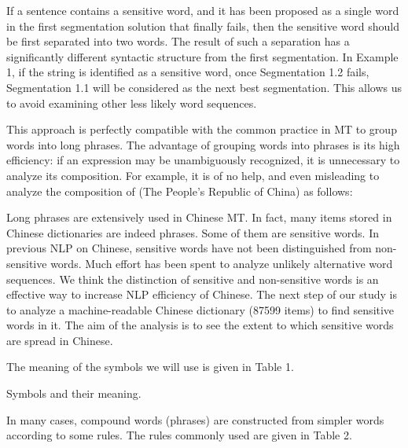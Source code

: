 If a sentence contains a sensitive word, and it has been proposed as a single word in the first segmentation solution that 
finally fails, then the sensitive word should be first separated into two words. The result of such a separation has a 
significantly different syntactic structure from the first segmentation. In Example 1, if the string   is identified as a 
sensitive word, once Segmentation 1.2 fails, Segmentation 1.1 will be considered as the next best segmentation. This 
allows us to avoid examining other less likely word sequences.

This approach is perfectly compatible with the common practice in MT to group words into long phrases. The 
advantage of grouping words into phrases is its high efficiency: if an expression may be unambiguously recognized, it 
is unnecessary to analyze its composition. For example, it is of no help, and even misleading to analyze the composition of 
 (The People's Republic of China) as follows:

\medskip


  
 
  

Long phrases are extensively used in Chinese MT. In fact, many items stored in Chinese dictionaries are indeed 
phrases. Some of them are sensitive words. In previous NLP on Chinese, sensitive words have not been distinguished 
from non-sensitive words. Much effort has been spent to analyze unlikely alternative word sequences. We think the 
distinction of sensitive and non-sensitive words is an effective way to increase NLP efficiency of Chinese. The next 
step of our study is to analyze a machine-readable Chinese dictionary (87599 items) to find sensitive words in it. The 
aim of the analysis is to see the extent to which sensitive words are spread in Chinese.

The meaning of the symbols we will use is given in Table 1.

\begin{table}
\caption{Symbols and their meaning.}
\medskip
\vspace{-3mm}
\begin{center}
\end{center}
\vspace{-3mm}
\end{table}

In many cases, compound words (phrases) are constructed from simpler words according to some rules. The 
rules commonly used are given in Table 2.

